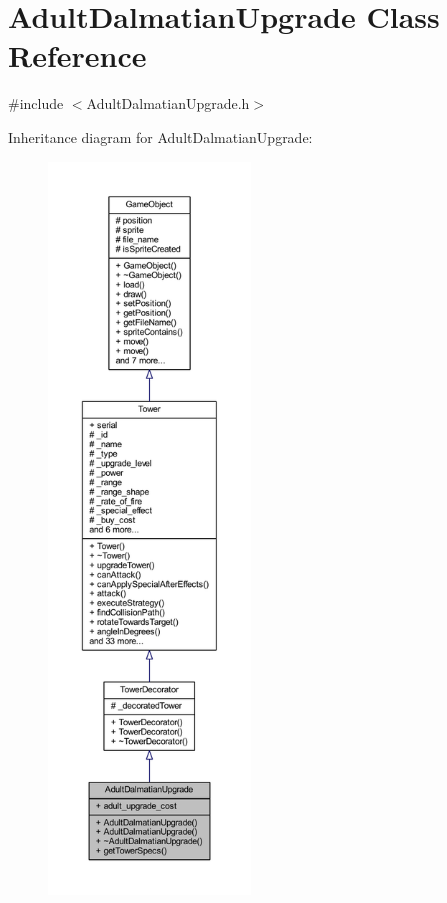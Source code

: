 \hypertarget{class_adult_dalmatian_upgrade}{\section{Adult\+Dalmatian\+Upgrade Class Reference}
\label{class_adult_dalmatian_upgrade}
}


{\ttfamily \#include $<$Adult\+Dalmatian\+Upgrade.\+h$>$}



Inheritance diagram for Adult\+Dalmatian\+Upgrade\+:
\nopagebreak
\begin{figure}[H]
\begin{center}
\leavevmode
\includegraphics[height=550pt]{class_adult_dalmatian_upgrade__inherit__graph}
\end{center}
\end{figure}


